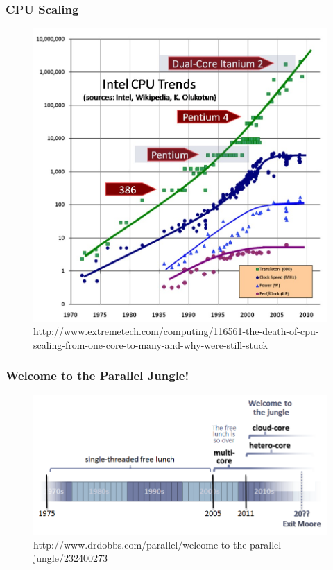 \documentclass[12pt]{beamer}
\begin{document}
\begin{frame}
\frametitle{CPU Scaling}
\begin{figure}
\includegraphics[height=0.7\textheight]{img/cpuscaling}
\caption{http://www.extremetech.com/computing/116561-the-death-of-cpu-scaling-from-one-core-to-many-and-why-were-still-stuck}
\end{figure}
\end{frame}

\begin{frame}
\frametitle{Welcome to the Parallel Jungle!}
\begin{figure}
\includegraphics[width=\textwidth]{img/sutter}
\caption{http://www.drdobbs.com/parallel/welcome-to-the-parallel-jungle/232400273}
\end{figure}
\end{frame}
\end{document}
